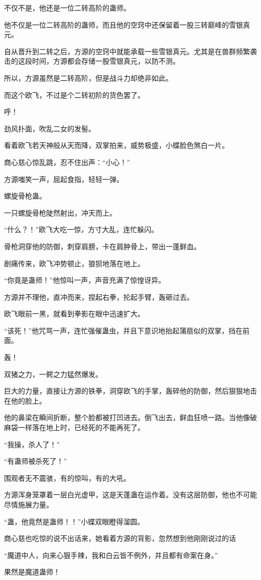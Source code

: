 \begin{this_body}
不仅不是，他还是一位二转高阶的蛊师。

他不仅是一位二转高阶的蛊师，而且他的空窍中还保留着一股三转巅峰的雪银真元。

自从晋升到二转之后，方源的空窍中就能承载一些雪银真元。尤其是在兽群频繁袭击的这段时间，方源都会存储一股雪银真元，以防不测。

所以，方源虽然是二转高阶，但是战斗力却绝非如此。

而这个欧飞，不过是个二转初阶的货色罢了。

呼！

劲风扑面，吹乱二女的发髻。

看着欧飞若天神般从天而降，双掌拍来，威势极盛，小蝶脸色煞白一片。

商心慈心惊乱跳，忍不住出声：“小心！”

方源嗤笑一声，屈起食指，轻轻一弹。

螺旋骨枪蛊。

一只螺旋骨枪陡然射出，冲天而上。

“什么？！”欧飞大吃一惊，方寸大乱，连忙躲闪。

骨枪洞穿他的防御，刺穿肩膀，卡在肩肿骨上，带出一蓬鲜血。

剧痛传来，欧飞冲势顿止，狼狈地落在地上。

“你竟是蛊师！”他惊叫一声，声音充满了惊惶讶异。

方源并不理他，直冲而来，捏起右拳，抡起手臂，轰砸过去。

欧飞眼前一黑，就看到拳影在眼中迅速扩大。

“该死！”他咒骂一声，连忙强催蛊虫，并且下意识地抬起蒲扇似的双掌，挡在前面。

轰！

双猪之力，一鳄之力猛然爆发。

巨大的力量，直接让方源的铁拳，洞穿欧飞的手掌，轰碎他的防御，然后狠狠地击在他的脸上。

他的鼻梁在瞬间折断，整个脸都被打凹进去。倒飞出去，鲜血狂喷一路。当他像破麻袋一样落在地上时，已经死的不能再死了。

“我操，杀人了！”

“有蛊师被杀死了！”

围观者无不震骇，有的惊叫，有的大吼。

方源浑身笼罩着一层白光虚甲，这是天蓬蛊在运作着。没有这层防御，他也不可能尽情施展力量。

“蛊，他竟然是蛊师！！”小蝶双眼瞪得溜圆。

商心慈也吃惊的说不出话来，她看着方源的背影，忽然想到他刚刚说过的话

“魔道中人，向来心狠手辣，我和白云皆不例外，并且都有命案在身。”

果然是魔道蛊师！

\end{this_body}

